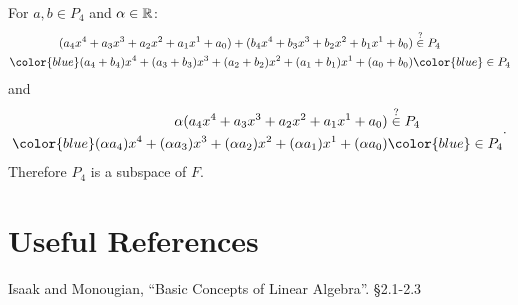 For $a,b \in P_4$ and $\alpha\in\operatorname{\mathbb{R}}$:
\[\begin{aligned} (a_4x^4 + a_3x^3 + a_2x^2 + a_1x^1 + a_0) + (b_4x^4 + b_3x^3 + b_2x^2 + b_1x^1 + b_0) & \stackrel{?}{\in}  P_4\\
\color{blue}(a_4+b_4)x^4 + (a_3+b_3)x^3 + (a_2+b_2)x^2 + (a_1+b_1)x^1 + (a_0+b_0)  &\color{blue}\in  P_4\end{aligned}\]
and
\[\begin{aligned} \alpha(a_4x^4 + a_3x^3 + a_2x^2 + a_1x^1 + a_0) & \stackrel{?}{\in}  P_4\\
\color{blue}(\alpha a_4)x^4 + (\alpha a_3)x^3 + (\alpha a_2)x^2 + (\alpha a_1)x^1 + (\alpha a_0)  &\color{blue}\in  P_4\end{aligned}.\]
Therefore $P_4$ is a subspace of $F$. 




\section*{Useful References}
Isaak and Monougian, ``Basic Concepts of Linear Algebra''. \S 2.1-2.3\\

